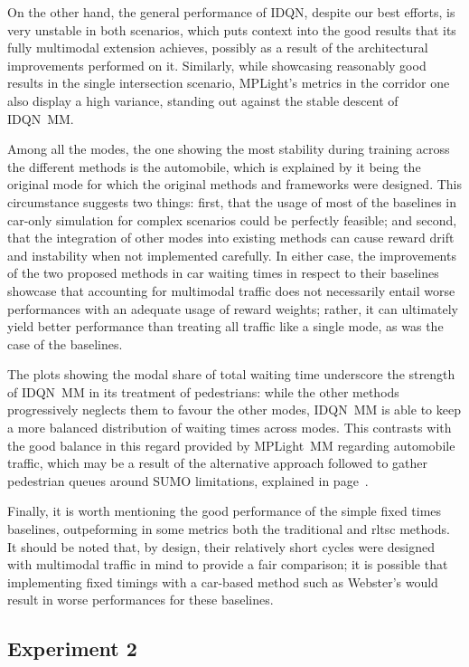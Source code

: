 On the other hand, the general performance of IDQN, despite our best efforts, is very unstable in both scenarios, which puts context into the good results that its fully multimodal extension achieves, possibly as a result of the architectural improvements performed on it. Similarly, while showcasing reasonably good results in the single intersection scenario, MPLight's metrics in the corridor one also display a high variance, standing out against the stable descent of IDQN~MM.

Among all the modes, the one showing the most stability during training across the different methods is the automobile, which is explained by it being the original mode for which the original methods and frameworks were designed. This circumstance suggests two things: first, that the usage of most of the baselines in car-only simulation for complex scenarios could be perfectly feasible; and second, that the integration of other modes into existing methods can cause reward drift and instability when not implemented carefully. In either case, the improvements of the two proposed methods in car waiting times in respect to their baselines showcase that accounting for multimodal traffic does not necessarily entail worse performances with an adequate usage of reward weights; rather, it can ultimately yield better performance than treating all traffic like a single mode, as was the case of the baselines.

The plots showing the modal share of total waiting time underscore the strength of IDQN~MM in its treatment of pedestrians: while the other methods progressively neglects them to favour the other modes, IDQN~MM is able to keep a more balanced distribution of waiting times across modes. This contrasts with the good balance in this regard provided by MPLight~MM regarding automobile traffic, which may be a result of the alternative approach followed to gather pedestrian queues around SUMO limitations, explained in page~\pageref{par:putosumo}.

\noindent Finally, it is worth mentioning the good performance of the simple fixed times baselines, outpeforming in some metrics both the traditional and \gls{rltsc} methods. It should be noted that, by design, their relatively short cycles were designed with multimodal traffic in mind to provide a fair comparison; it is possible that implementing fixed timings with a car-based method such as Webster's would result in worse performances for these baselines.

\subsection{Experiment 2}

